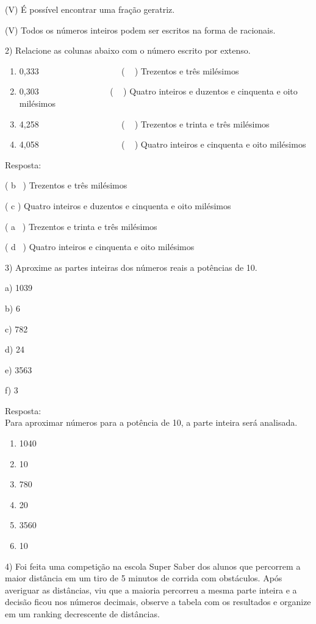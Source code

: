 (V) É possível encontrar uma fração geratriz.

(V) Todos os números inteiros podem ser escritos na forma de racionais.

2) Relacione as colunas abaixo com o número escrito por extenso.

\begin{enumerate}
\def\labelenumi{\alph{enumi})}
\item
  0,333~ ~ ~ ~ ~ ~ ~ ~ ~ ~ ~ ~( ~ ) Trezentos e três milésimos~
\item
  0,303~ ~ ~ ~ ~ ~ ~ ~ ~ ~ ( ~ ) Quatro inteiros e duzentos e cinquenta
  e oito milésimos
\item
  4,258~ ~ ~ ~ ~ ~ ~ ~ ~ ~ ~ ~( ~ ) Trezentos e trinta e três milésimos
\item
  4,058~ ~ ~ ~ ~ ~ ~ ~ ~ ~ ~ ~( ~ ) Quatro inteiros e cinquenta e oito
  milésimos
\end{enumerate}

Resposta:

( b~ ) Trezentos e três milésimos~

( c ) Quatro inteiros e duzentos e cinquenta e oito milésimos

( a~ ) Trezentos e trinta e três milésimos

( d~ ) Quatro inteiros e cinquenta e oito milésimos

3) Aproxime as partes inteiras dos números reais a potências de 10.

a) 1039

b) 6

c) 782

d) 24

e) 3563

f) 3

Resposta:\\
Para aproximar números para a potência de 10, a parte inteira será
analisada.

\begin{enumerate}
\def\labelenumi{\alph{enumi})}
\item
  1040
\item
  10
\item
  780
\item
  20
\item
  3560
\item
  10
\end{enumerate}

4) Foi feita uma competição na escola Super Saber dos alunos que
percorrem a maior distância em um tiro de 5 minutos de corrida com
obstáculos. Após averiguar as distâncias, viu que a maioria percorreu a
mesma parte inteira e a decisão ficou nos números decimais, observe a
tabela com os resultados e organize em um ranking decrescente de
distâncias.~

